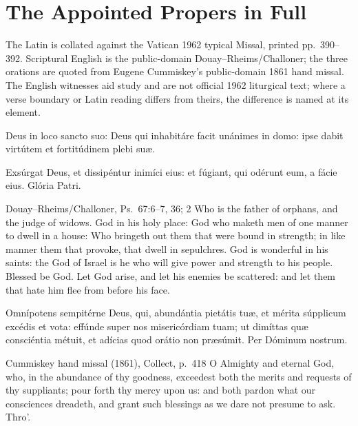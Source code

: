 \section*{The Appointed Propers in Full}

\noindent The Latin is collated against the Vatican 1962 typical Missal,
printed pp.~390--392. Scriptural English is the public-domain
Douay--Rheims/Challoner; the three orations are quoted from Eugene
Cummiskey's public-domain 1861 hand missal. The English witnesses aid study
and are not official 1962 liturgical text; where a verse boundary or Latin
reading differs from theirs, the difference is named at its element.

Deus in loco sancto suo: Deus qui inhabitáre facit unánimes in domo: ipse
dabit virtútem et fortitúdinem plebi suæ.

\medskip\noindent{} Exsúrgat Deus, et dissipéntur inimíci eius:
et fúgiant, qui odérunt eum, a fácie eius.  Glória Patri.
\finishfulltextelement
\begin{fulltextenglish}{Douay--Rheims/Challoner, Ps.~67:6--7, 36; 2}
Who is the father of orphans, and the judge of widows. God in his holy place:
God who maketh men of one manner to dwell in a house: Who bringeth out them
that were bound in strength; in like manner them that provoke, that dwell in
sepulchres. God is wonderful in his saints: the God of Israel is he who will
give power and strength to his people. Blessed be God. Let God arise, and let
his enemies be scattered: and let them that hate him flee from before his
face.
\end{fulltextenglish}

Omnípotens sempitérne Deus, qui, abundántia pietátis tuæ, et mérita súpplicum
excédis et vota: effúnde super nos misericórdiam tuam; ut dimíttas quæ
consciéntia métuit, et adícias quod orátio non præsúmit. Per Dóminum nostrum.
\finishfulltextelement
\begin{fulltextenglish}{Cummiskey hand missal (1861), Collect, p.~418}
O Almighty and eternal God, who, in the abundance of thy goodness, exceedest
both the merits and requests of thy suppliants; pour forth thy mercy upon us:
and both pardon what our consciences dreadeth, and grant such blessings as we
dare not presume to ask. Thro'.
\end{fulltextenglish}

